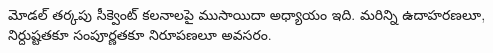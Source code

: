\documentclass[../../../include/open-logic-chapter]{subfiles}
\begin{document}
\begin{editorial}
  మోడల్ తర్కపు సీక్వెంట్ కలనాలపై ముసాయిదా అధ్యాయం ఇది.
  మరిన్ని ఉదాహరణలూ, నిర్దుష్టతకూ సంపూర్ణతకూ నిరూపణలూ అవసరం.
\end{editorial}


\OLEndChapterHook
\end{document}

